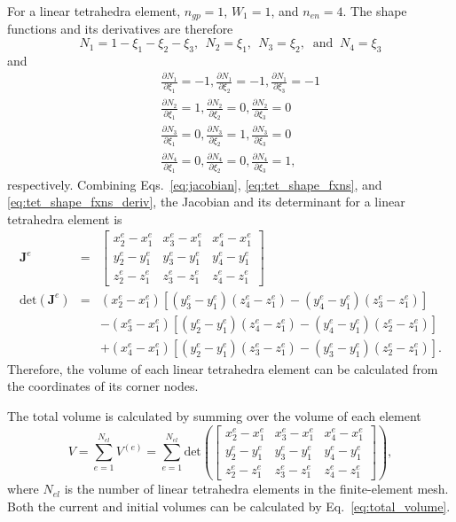 \documentclass[12pt,aps,pre]{revtex4}
\begin{document}
For a linear tetrahedra element, $n_{gp}=1$, $W_1=1$, and $n_{en}=4$. The shape functions and its derivatives are therefore
%
\begin{equation}
N_1 = 1- \xi_1 - \xi_2 - \xi_3, \ \ 
N_2 = \xi_1, \ \
N_3 = \xi_2, \ \text{ and } \
N_4 = \xi_3
\label{eq:tet_shape_fxns}
\end{equation}
%
and
%
\begin{eqnarray}
&&\frac{\partial N_1}{\partial \xi_1} = -1, \frac{\partial N_1}{\partial \xi_2} = -1, \frac{\partial N_1}{\partial \xi_3} = -1 \nonumber\\
%
&&\frac{\partial N_2}{\partial \xi_1} = 1, \frac{\partial N_2}{\partial \xi_2} = 0, \frac{\partial N_2}{\partial \xi_3} = 0 \nonumber\\
%
&&\frac{\partial N_3}{\partial \xi_1} = 0, \frac{\partial N_3}{\partial \xi_2} = 1, \frac{\partial N_3}{\partial \xi_3} = 0 \nonumber\\
%
&&\frac{\partial N_4}{\partial \xi_1} = 0, \frac{\partial N_4}{\partial \xi_2} = 0, \frac{\partial N_4}{\partial \xi_3} = 1,
\label{eq:tet_shape_fxns_deriv}
\end{eqnarray}
%
respectively. Combining Eqs.\ \eqref{eq:jacobian}, \eqref{eq:tet_shape_fxns}, and \eqref{eq:tet_shape_fxns_deriv}, the Jacobian and its determinant for a linear tetrahedra element is 
%
\begin{eqnarray}
\pmb{J}^e &=& \begin{bmatrix}
x_2^e - x_1^e & x_3^e - x_1^e & x_4^e - x_1^e \\
%
y_2^e - y_1^e & y_3^e - y_1^e & y_4^e - y_1^e \\
%
z_2^e - z_1^e & z_3^e - z_1^e & z_4^e - z_1^e 
\end{bmatrix} \nonumber\\
%
\text{det}(\pmb{J}^e) &=& (x_2^e - x_1^e)[(y_3^e - y_1^e)(z_4^e - z_1^e)-(y_4^e - y_1^e)(z_3^e - z_1^e)] \nonumber\\
%
&&-(x_3^e - x_1^e)[(y_2^e - y_1^e)(z_4^e - z_1^e)-(y_4^e - y_1^e)(z_2^e - z_1^e)] \nonumber\\
%
&&+(x_4^e - x_1^e)[(y_2^e - y_1^e)(z_3^e - z_1^e)-(y_3^e - y_1^e)(z_2^e - z_1^e)].
\end{eqnarray}
%
Therefore, the volume of each linear tetrahedra element can be calculated from the coordinates of its corner nodes.

The total volume is calculated by summing over the volume of each element
%
\begin{equation}
V = \sum_{e=1}^{N_{el}} V^{(e)} = \sum_{e=1}^{N_{el}}\text{det}\left( \begin{bmatrix}
x_2^e - x_1^e & x_3^e - x_1^e & x_4^e - x_1^e \\
%
y_2^e - y_1^e & y_3^e - y_1^e & y_4^e - y_1^e \\
%
z_2^e - z_1^e & z_3^e - z_1^e & z_4^e - z_1^e 
\end{bmatrix}\right),
\label{eq:total_volume}
\end{equation}
%
where $N_{el}$ is the number of linear tetrahedra elements in the finite-element mesh. Both the current and initial volumes can be calculated by Eq.\ \eqref{eq:total_volume}.
\end{document}
